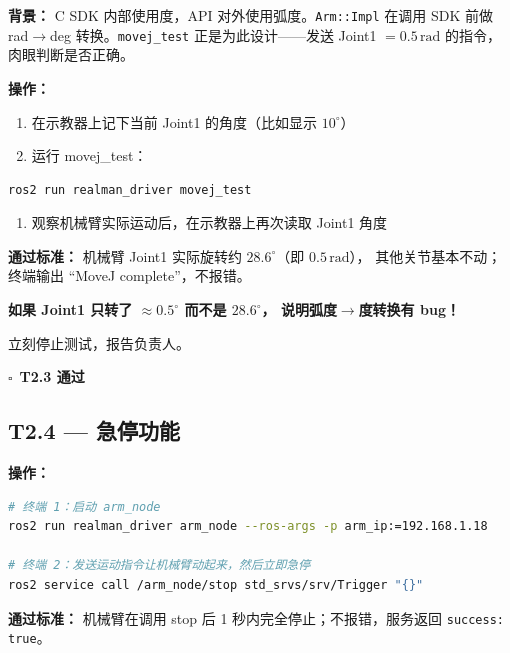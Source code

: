 \documentclass[12pt,a4paper,fontset=ubuntu]{ctexart}
\newcommand{\chkbox}{$\square$}
\newcommand{\passcriteria}[1]{%
  \textbf{通过标准：} #1%
}
\begin{document}
\textbf{背景：} C SDK 内部使用度，API 对外使用弧度。\texttt{Arm::Impl}
在调用 SDK 前做 rad$\rightarrow$deg 转换。\texttt{movej\_test}
正是为此设计——发送 Joint1 $=0.5\,\text{rad}$ 的指令，肉眼判断是否正确。

\textbf{操作：}

\begin{enumerate}[nosep]
  \item 在示教器上记下当前 Joint1 的角度（比如显示 $10^\circ$）
  \item 运行 movej\_test：
\end{enumerate}

\begin{lstlisting}[language=bash]
ros2 run realman_driver movej_test
\end{lstlisting}

\begin{enumerate}[nosep, start=3]
  \item 观察机械臂实际运动后，在示教器上再次读取 Joint1 角度
\end{enumerate}

\passcriteria{
  机械臂 Joint1 实际旋转约 $28.6^\circ$（即 $0.5\,\text{rad}$），
  其他关节基本不动；终端输出 ``MoveJ complete''，不报错。
}

\begin{criticalbox}
\textbf{如果 Joint1 只转了 $\approx0.5^\circ$ 而不是 $28.6^\circ$，
说明弧度$\rightarrow$度转换有 bug！}

立刻停止测试，报告负责人。
\end{criticalbox}

\begin{center}\chkbox\ \textbf{T2.3 通过}\end{center}


\subsection{T2.4 — 急停功能}

\textbf{操作：}

\begin{lstlisting}[language=bash]
# 终端 1：启动 arm_node
ros2 run realman_driver arm_node --ros-args -p arm_ip:=192.168.1.18

# 终端 2：发送运动指令让机械臂动起来，然后立即急停
ros2 service call /arm_node/stop std_srvs/srv/Trigger "{}"
\end{lstlisting}

\passcriteria{
  机械臂在调用 stop 后 1 秒内完全停止；不报错，服务返回 \texttt{success: true}。
}
\end{document}
